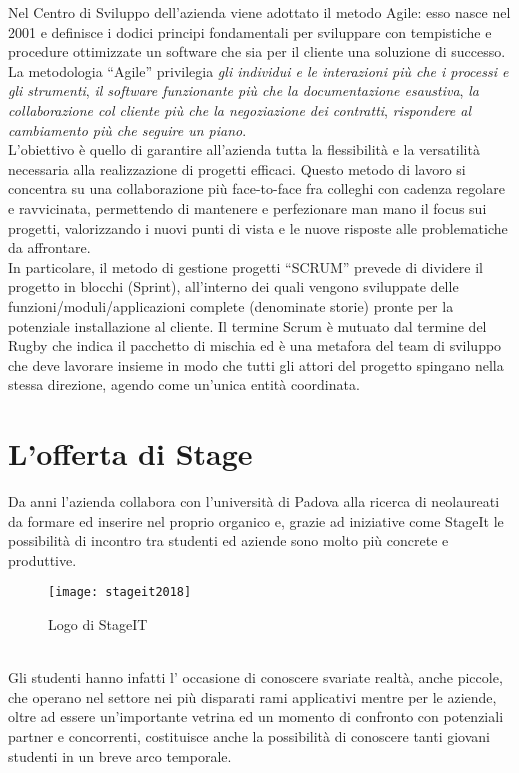 Nel Centro di Sviluppo dell'azienda viene adottato il metodo Agile: esso nasce nel 2001 e definisce i dodici principi fondamentali per sviluppare con tempistiche e procedure ottimizzate un software che sia per il cliente una soluzione di successo. La metodologia “Agile” privilegia \emph{gli individui e le interazioni più che i processi e gli strumenti}, \emph{il software funzionante più che la documentazione esaustiva}, \emph{la collaborazione col cliente più che la negoziazione dei contratti}, \emph{rispondere al cambiamento più che seguire un piano}. \\ L’obiettivo è quello di garantire all’azienda tutta la flessibilità e la versatilità necessaria alla realizzazione di progetti efficaci. Questo metodo di lavoro si concentra su una collaborazione più face-to-face fra colleghi con cadenza regolare e ravvicinata, permettendo di mantenere e perfezionare man mano il focus sui progetti, valorizzando i nuovi punti di vista e le nuove risposte alle problematiche da affrontare. \\ In particolare, il metodo di gestione progetti “SCRUM” prevede di dividere il progetto in blocchi (Sprint), all’interno dei quali vengono sviluppate delle funzioni/moduli/applicazioni complete (denominate storie) pronte per la potenziale installazione al cliente. Il termine Scrum è mutuato dal termine del Rugby che indica il pacchetto di mischia ed è una metafora del team di sviluppo che deve lavorare insieme in modo che tutti gli attori del progetto spingano nella stessa direzione, agendo come un’unica entità coordinata.


\section{L'offerta di Stage}
Da anni l'azienda collabora con l'università di Padova alla ricerca di neolaureati da formare ed inserire nel proprio organico e, grazie ad iniziative come StageIt le possibilità di incontro tra studenti ed aziende sono molto più concrete e produttive.\\ %
\begin{figure}[h]
\centering
\texttt{[image: stageit2018]}
\caption{Logo di StageIT}
\end{figure}\\ 
Gli studenti hanno infatti l' occasione di conoscere svariate realtà, anche piccole, che operano nel settore nei più disparati rami applicativi mentre per le aziende, oltre ad essere un'importante vetrina ed un momento di confronto con potenziali partner e concorrenti, costituisce anche la possibilità di conoscere tanti giovani studenti in un breve arco temporale.\\
